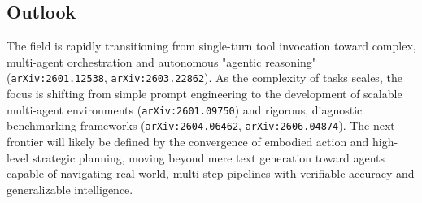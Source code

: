 \documentclass[11pt]{article}
\begin{document}
\subsection{Outlook}

The field is rapidly transitioning from single-turn tool invocation toward complex, multi-agent orchestration and autonomous "agentic reasoning" (\texttt{arXiv:2601.12538}, \texttt{arXiv:2603.22862}). As the complexity of tasks scales, the focus is shifting from simple prompt engineering to the development of scalable multi-agent environments (\texttt{arXiv:2601.09750}) and rigorous, diagnostic benchmarking frameworks (\texttt{arXiv:2604.06462}, \texttt{arXiv:2606.04874}). The next frontier will likely be defined by the convergence of embodied action and high-level strategic planning, moving beyond mere text generation toward agents capable of navigating real-world, multi-step pipelines with verifiable accuracy and generalizable intelligence.
\end{document}
